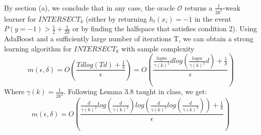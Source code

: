 \subsubsection{}
By section (a), we conclude that in any case, the oracle $\mathcal{O}$ returns a $\frac{1}{2k^2}$-weak learner for $INTERSECT_k$ (either by returning $h_t(x_i) = -1$ in the event $P(y=-1) > \frac{1}{2} + \frac{1}{2k}$ or by finding the halfspace that satisfies condition 2). Using AdaBoost and a sufficiently large number of iterations T, we can obtain a strong learning algorithm for $INTERSECT_k$ with sample complexity
\begin{equation*}    
    m(\epsilon, \delta) = O(\frac{Tdlog(Td) + \frac{1}{\delta}}{\epsilon}) = O(\frac{\frac{log m}{\gamma(k)^2}dlog(\frac{log m}{\gamma(k)^2}d) + \frac{1}{\delta}}{\epsilon})
\end{equation*}
Where $\gamma(k) = \frac{1}{2k^2}$. Following Lemma 3.8 taught in class, we get:
\begin{equation*}    
    m(\epsilon, \delta) = O(\frac{\frac{d}{\gamma(k)^2} log (\frac{d}{\gamma(k)^2}) log(\frac{d}{\gamma(k)^2} log (\frac{d}{\gamma(k)^2})) + \frac{1}{\delta}}{\epsilon})
\end{equation*}

